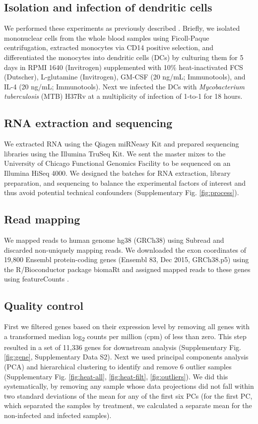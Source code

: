 \documentclass[fleqn,10pt]{wlscirep}
\begin{document}
\subsection*{Isolation and infection of dendritic cells}

We performed these experiments as previously described
\cite{Barreiro2012}. Briefly, we isolated mononuclear cells from the
whole blood samples using Ficoll-Paque centrifugation, extracted
monocytes via CD14 positive selection, and differentiated the
monocytes into dendritic cells (DCs) by culturing them for 5 days in
RPMI 1640 (Invitrogen) supplemented with 10\% heat-inactivated FCS
(Dutscher), L-glutamine (Invitrogen), GM-CSF (20 ng/mL; Immunotools),
and IL-4 (20 ng/mL; Immunotools). Next we infected the DCs with
\emph{Mycobacterium tuberculosis} (MTB) H37Rv at a multiplicity of
infection of 1-to-1 for 18 hours.
\subsection*{RNA extraction and sequencing}

We extracted RNA using the Qiagen miRNeasy Kit and prepared sequencing
libraries using the Illumina TruSeq Kit. We sent the master mixes to
the University of Chicago Functional Genomics Facility to be sequenced
on an Illumina HiSeq 4000. We designed the batches for RNA extraction,
library preparation, and sequencing to balance the experimental
factors of interest and thus avoid potential technical confounders
(Supplementary Fig. \ref{fig:process}).
\subsection*{Read mapping}

We mapped reads to human genome hg38 (GRCh38) using Subread
\cite{Liao2013} and discarded non-uniquely mapping reads. We
downloaded the exon coordinates of 19,800 Ensembl \cite{Yates2016}
protein-coding genes (Ensembl 83, Dec 2015, GRCh38.p5) using the
R/Bioconductor \cite{Huber2015} package biomaRt \cite{Durinck2005,
Durinck2009} and assigned mapped reads to these genes using
featureCounts \cite{Liao2014}.
\subsection*{Quality control}

First we filtered genes based on their expression level by removing
all genes with a transformed median log\textsubscript{2} counts per
million (cpm) of less than zero. This step resulted in a set of 11,336
genes for downstream analysis (Supplementary Fig. \ref{fig:gene},
Supplementary Data S2). Next we used principal components analysis
(PCA) and hierarchical clustering to identify and remove 6 outlier
samples (Supplementary Fig. \ref{fig:heat-all}, \ref{fig:heat-filt},
\ref{fig:outliers}). We did this systematically, by removing any
sample whose data projections did not fall within two standard
deviations of the mean for any of the first six PCs (for the first PC,
which separated the samples by treatment, we calculated a separate
mean for the non-infected and infected samples).
\end{document}
